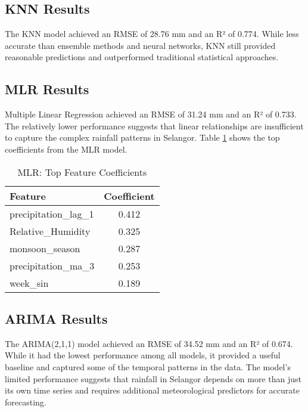 \documentclass[12pt]{article}
\begin{document}
\subsection{KNN Results}
\label{subsec:knn_results}

The KNN model achieved an RMSE of 28.76 mm and an R² of 0.774. While less accurate than ensemble methods and neural networks, KNN still provided reasonable predictions and outperformed traditional statistical approaches.

\subsection{MLR Results}
\label{subsec:mlr_results}

Multiple Linear Regression achieved an RMSE of 31.24 mm and an R² of 0.733. The relatively lower performance suggests that linear relationships are insufficient to capture the complex rainfall patterns in Selangor. Table \ref{tab:mlr_coefficients} shows the top coefficients from the MLR model.

\begin{table}[h]
\centering
\caption{MLR: Top Feature Coefficients}
\label{tab:mlr_coefficients}
\begin{tabular}{|l|c|}
\hline
\textbf{Feature} & \textbf{Coefficient} \\
\hline
precipitation\_lag\_1 & 0.412 \\
\hline
Relative\_Humidity & 0.325 \\
\hline
monsoon\_season & 0.287 \\
\hline
precipitation\_ma\_3 & 0.253 \\
\hline
week\_sin & 0.189 \\
\hline
\end{tabular}
\end{table}

\subsection{ARIMA Results}
\label{subsec:arima_results}

The ARIMA(2,1,1) model achieved an RMSE of 34.52 mm and an R² of 0.674. While it had the lowest performance among all models, it provided a useful baseline and captured some of the temporal patterns in the data. The model's limited performance suggests that rainfall in Selangor depends on more than just its own time series and requires additional meteorological predictors for accurate forecasting.
\end{document}
